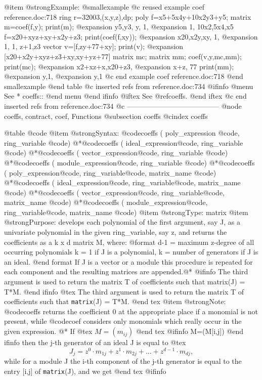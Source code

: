 @item @strong{Example:}
@smallexample
@c reused example coef reference.doc:718 
  ring r=32003,(x,y,z),dp;
  poly f=x5+5x4y+10x2y3+y5;
  matrix m=coef(f,y);
  print(m);
@expansion{} y5,y3,  y,  1,
@expansion{} 1, 10x2,5x4,x5
  f=x20+xyz+xy+x2y+z3;
  print(coef(f,xy));
@expansion{} x20,x2y,xy, 1,
@expansion{} 1,  1,  z+1,z3
  vector v=[f,zy+77+xy];
  print(v);
@expansion{} [x20+x2y+xyz+z3+xy,xy+yz+77]
  matrix mc; matrix mm;
  coef(v,y,mc,mm);
  print(mc);
@expansion{} x2+xz+x,x20+z3,
@expansion{} x+z,    77     
  print(mm);
@expansion{} y,1,
@expansion{} y,1 
@c end example coef reference.doc:718
@end smallexample
@end table
@c inserted refs from reference.doc:734
@ifinfo
@menu
See
* coeffs::
@end menu
@end ifinfo
@iftex
See
@ref{coeffs}.
@end iftex
@c end inserted refs from reference.doc:734
@c ---------------------------------------
@node coeffs, contract, coef, Functions
@subsection coeffs
@cindex coeffs

@table @code
@item @strong{Syntax:}
@code{coeffs (} poly_expression @code{,} ring_variable @code{)}
@*@code{coeffs (} ideal_expression@code{,} ring_variable @code{)}
@*@code{coeffs (} vector_expression@code{,} ring_variable @code{)}
@*@code{coeffs (} module_expression@code{,} ring_variable @code{)}
@*@code{coeffs (} poly_expression@code{,} ring_variable@code{,} matrix_name @code{)}
@*@code{coeffs (} ideal_expression@code{,} ring_variable@code{,} matrix_name @code{)}
@*@code{coeffs (} vector_expression@code{,} ring_variable@code{,} matrix_name @code{)}
@*@code{coeffs (} module_expression@code{,} ring_variable@code{,} matrix_name @code{)}
@item @strong{Type:}
matrix
@item @strong{Purpose:}
develops each polynomial of the first argument, say J,
as a univariate polynomial in the given ring_variable,
say z, and returns the coefficients as a k x d
matrix M,
where:
@format
    d-1 = maximum z-degree of all occurring polynomials
      k = 1 if J is a polynomial,
      k = number of generators  if J is an ideal.
@end format
If J is a vector or a module this procedure is repeated for each
component and the resulting matrices are appended.@*
@ifinfo
The third argument is used to return the matrix T of coefficients
such that matrix(J) = T*M.
@end ifinfo
@tex
The third argument is used to return the matrix T of coefficients
such that {\tt matrix}(J) = T*M.
@end tex
@item @strong{Note:}
@code{coeffs} returns the coefficient 0 at the appropriate place if a monomial
is not present, while @code{coef} considers only monomials which really occur
in the given expression. @*
If
@tex
$M=(m_{ij})$
@end tex
@ifinfo
M=(M[i,j])
@end ifinfo
then the j-th generator of an ideal J is equal to
@tex
$$J_j = z^0 \cdot m_{1j} + z^1 \cdot m_{2j} + ... + z^{d-1} \cdot m_{dj},$$
while for a module J the i-th component of the j-th generator is
equal to the entry [i,j] of {\tt matrix}(J), and we get
@end tex
@ifinfo

